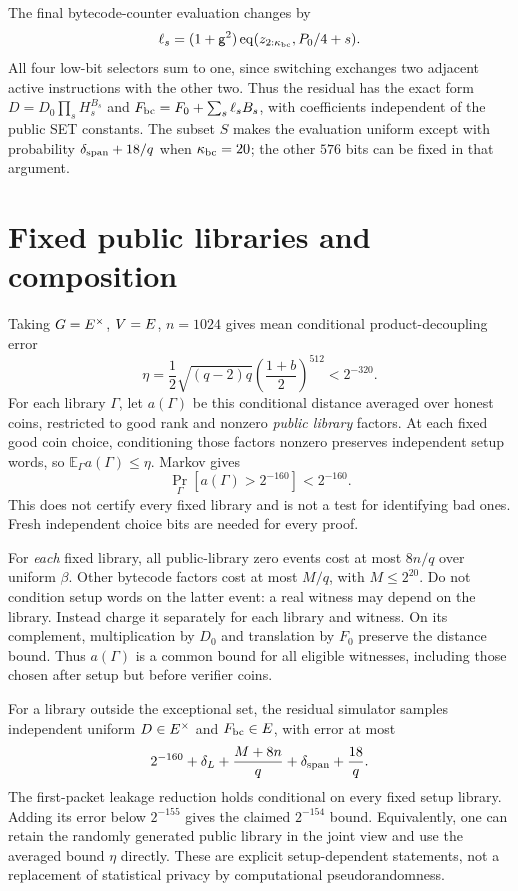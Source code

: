 \documentclass[11pt]{article}
\begin{document}
The final bytecode-counter evaluation changes by
\[
 \ell_s=(1+\mathsf{g}^2)\operatorname{eq}(z_{2:\kappa_{\mathrm{bc}}},P_0/4+s).
\]
All four low-bit selectors sum to one, since switching exchanges two adjacent active instructions with the other two. Thus the residual has the exact form $D=D_0\prod_sH_s^{B_s}$ and $F_{\rm bc}=F_0+\sum_s\ell_sB_s$, with coefficients independent of the public SET constants. The subset $S$ makes the evaluation uniform except with probability $\delta_{\rm span}+18/q$ when $\kappa_{\mathrm{bc}}=20$; the other $576$ bits can be fixed in that argument.

\section{Fixed public libraries and composition}

Taking $G=E^\times$, $V=E$, $n=1024$ gives mean conditional product-decoupling error
\[
 \eta=\frac12\sqrt{(q-2)q}
       \left(\frac{1+b}{2}\right)^{512}<2^{-320}.
\]
For each library $\Gamma$, let $a(\Gamma)$ be this conditional distance averaged over honest coins, restricted to good rank and nonzero \emph{public library} factors. At each fixed good coin choice, conditioning those factors nonzero preserves independent setup words, so $\mathbb E_\Gamma a(\Gamma)\le\eta$. Markov gives
\[
 \Pr_\Gamma[a(\Gamma)>2^{-160}]<2^{-160}.
\]
This does not certify every fixed library and is not a test for identifying bad ones. Fresh independent choice bits are needed for every proof.

For \emph{each} fixed library, all public-library zero events cost at most $8n/q$ over uniform $\beta$. Other bytecode factors cost at most $M/q$, with $M\le2^{20}$. Do not condition setup words on the latter event: a real witness may depend on the library. Instead charge it separately for each library and witness. On its complement, multiplication by $D_0$ and translation by $F_0$ preserve the distance bound. Thus $a(\Gamma)$ is a common bound for all eligible witnesses, including those chosen after setup but before verifier coins.

For a library outside the exceptional set, the residual simulator samples independent uniform $D\in E^\times$ and $F_{\rm bc}\in E$, with error at most
\[
 2^{-160}+\delta_L+\frac{M+8n}{q}
 +\delta_{\rm span}+\frac{18}{q}.
\]
The first-packet leakage reduction holds conditional on every fixed setup library. Adding its error below $2^{-155}$ gives the claimed $2^{-154}$ bound. Equivalently, one can retain the randomly generated public library in the joint view and use the averaged bound $\eta$ directly. These are explicit setup-dependent statements, not a replacement of statistical privacy by computational pseudorandomness.
\end{document}
